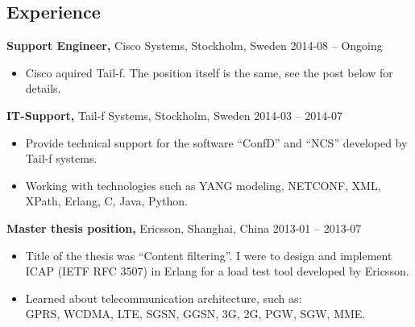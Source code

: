 \documentclass[margin]{res}
\begin{document}

\address{{\bf Contact information}\\

linkedin.com/in/tommymattsson\\
github.com/Taddic\\
}

\address{{\bf Address}\\
  \\
}

\begin{resume}

\section{Experience}
{\bf Support Engineer,} Cisco Systems, Stockholm, Sweden \hfill 2014-08 -- Ongoing
 \begin{itemize} \itemsep -2pt  %
 \item Cisco aquired Tail-f. The position itself is the same, see
   the post below for details.
 \end{itemize}

{\bf IT-Support,} Tail-f Systems, Stockholm, Sweden \hfill 2014-03 -- 2014-07
 \begin{itemize} \itemsep -2pt  %
 \item Provide technical support for the software ``ConfD'' and ``NCS''
   developed by Tail-f systems.
 \item Working with technologies such as YANG modeling, NETCONF,
   XML, XPath, Erlang, C, Java, Python.
 \end{itemize}

{\bf Master thesis position,} Ericsson, Shanghai, China \hfill 2013-01 -- 2013-07
 \begin{itemize} \itemsep -2pt  %
 \item Title of the thesis was ``Content filtering''. I were to design
   and implement ICAP (IETF RFC 3507) in Erlang for a load test tool
   developed by Ericsson.
 \item Learned about telecommunication architecture, such as: \\
 GPRS, WCDMA, LTE, SGSN, GGSN, 3G, 2G, PGW, SGW, MME.
 \end{itemize}


\end{resume}
\end{document}
